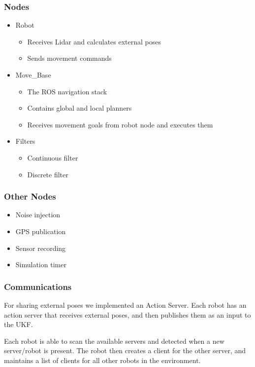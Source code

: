 \documentclass[14pt]{beamer}
\begin{document}
\begin{frame}
\frametitle{Nodes}
\begin{itemize}
\item Robot
    \begin{itemize}
    \item Receives Lidar and calculates external poses
    \item Sends movement commands
    \end{itemize}
\pause
\item Move\_Base
    \begin{itemize}
    \item The ROS navigation stack
    \item Contains global and local planners
    \item Receives movement goals from robot node and executes them
    \end{itemize}
\pause
\item Filters
    \begin{itemize}
    \item Continuous filter
    \item Discrete filter
    \end{itemize}
\end{itemize}
\end{frame}

\begin{frame}
\frametitle{Other Nodes}
\begin{itemize}
\item Noise injection
\item GPS publication
\item Sensor recording
\item Simulation timer
\end{itemize}
\end{frame}

\begin{frame}
\frametitle{Communications}
For sharing external poses we implemented an Action Server. Each robot has an action server that receives external poses, and then publishes them as an input to the UKF.
\vspace{14pt}

\pause
Each robot is able to scan the available servers and detected when a new server/robot is present. The robot then creates a client for the other server, and maintains a list of clients for all other robots in the environment.
\end{frame}
\end{document}
